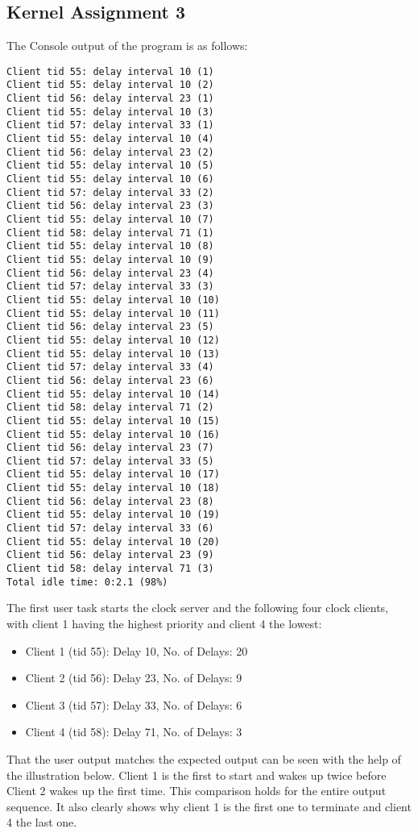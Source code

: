 \documentclass[12pt, titlepage]{article}
\begin{document}
    \subsection{Kernel Assignment 3}
    The Console output of the program is as follows: 
    \begin{verbatim}
Client tid 55: delay interval 10 (1)
Client tid 55: delay interval 10 (2)
Client tid 56: delay interval 23 (1)
Client tid 55: delay interval 10 (3)
Client tid 57: delay interval 33 (1)
Client tid 55: delay interval 10 (4)
Client tid 56: delay interval 23 (2)
Client tid 55: delay interval 10 (5)
Client tid 55: delay interval 10 (6)
Client tid 57: delay interval 33 (2)
Client tid 56: delay interval 23 (3)
Client tid 55: delay interval 10 (7)
Client tid 58: delay interval 71 (1)
Client tid 55: delay interval 10 (8)
Client tid 55: delay interval 10 (9)
Client tid 56: delay interval 23 (4)
Client tid 57: delay interval 33 (3)
Client tid 55: delay interval 10 (10)
Client tid 55: delay interval 10 (11)
Client tid 56: delay interval 23 (5)
Client tid 55: delay interval 10 (12)
Client tid 55: delay interval 10 (13)
Client tid 57: delay interval 33 (4)
Client tid 56: delay interval 23 (6)
Client tid 55: delay interval 10 (14)
Client tid 58: delay interval 71 (2)
Client tid 55: delay interval 10 (15)
Client tid 55: delay interval 10 (16)
Client tid 56: delay interval 23 (7)
Client tid 57: delay interval 33 (5)
Client tid 55: delay interval 10 (17)
Client tid 55: delay interval 10 (18)
Client tid 56: delay interval 23 (8)
Client tid 55: delay interval 10 (19)
Client tid 57: delay interval 33 (6)
Client tid 55: delay interval 10 (20)
Client tid 56: delay interval 23 (9)
Client tid 58: delay interval 71 (3)
Total idle time: 0:2.1 (98%)
    \end{verbatim}
    The first user task starts the clock server and the following four clock clients, with client 1 having the highest priority and client 4 the lowest:
    \begin{itemize}
        \item Client 1 (tid 55):    Delay 10,   No. of Delays: 20
        \item Client 2 (tid 56):    Delay 23,   No. of Delays: 9
        \item Client 3 (tid 57):    Delay 33,   No. of Delays: 6
        \item Client 4 (tid 58):    Delay 71,   No. of Delays: 3
    \end{itemize}

    That the user output matches the expected output can be seen with the help of the illustration below. 
    Client 1 is the first to start and wakes up twice before Client 2 wakes up the first time. 
    This comparison holds for the entire output sequence. It also clearly shows why client 1 is the first one to terminate and client 4 the last one. 
\end{document}
